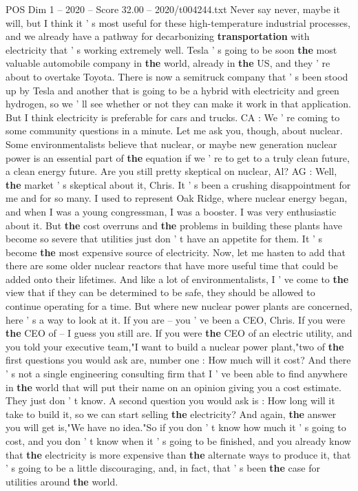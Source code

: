 \begin{textsample}{POS Dim 1 – 2020 – Score 32.00 – 2020/t004244.txt}
Never say never, maybe it will, but I think it ' s most useful for these high-temperature industrial processes, and we already have a pathway for decarbonizing \textbf{transportation} with electricity that ' s working extremely well.
Tesla ' s going to be soon \textbf{the} most valuable automobile company in \textbf{the} world, already in \textbf{the} US, and they ' re about to overtake Toyota.
There is now a semitruck company that ' s been stood up by Tesla and another that is going to be a hybrid with electricity and green hydrogen, so we ' ll see whether or not they can make it work in that application.
But I think electricity is preferable for cars and trucks.
CA : We ' re coming to some community questions in a minute.
Let me ask you, though, about nuclear.
Some environmentalists believe that nuclear, or maybe new generation nuclear power is an essential part of \textbf{the} equation if we ' re to get to a truly clean future, a clean energy future.
Are you still pretty skeptical on nuclear, Al?
AG : Well, \textbf{the} market ' s skeptical about it, Chris.
It ' s been a crushing disappointment for me and for so many.
I used to represent Oak Ridge, where nuclear energy began, and when I was a young congressman, I was a booster.
I was very enthusiastic about it.
But \textbf{the} cost overruns and \textbf{the} problems in building these plants have become so severe that utilities just don ' t have an appetite for them.
It ' s become \textbf{the} most expensive source of electricity.
Now, let me hasten to add that there are some older nuclear reactors that have more useful time that could be added onto their lifetimes.
And like a lot of environmentalists, I ' ve come to \textbf{the} view that if they can be determined to be safe, they should be allowed to continue operating for a time.
But where new nuclear power plants are concerned, here ' s a way to look at it.
If you are -- you ' ve been a CEO, Chris.
If you were \textbf{the} CEO of -- I guess you still are.
If you were \textbf{the} CEO of an electric utility, and you told your executive team,"I want to build a nuclear power plant,"two of \textbf{the} first questions you would ask are, number one : How much will it cost?
And there ' s not a single engineering consulting firm that I ' ve been able to find anywhere in \textbf{the} world that will put their name on an opinion giving you a cost estimate.
They just don ' t know.
A second question you would ask is : How long will it take to build it, so we can start selling \textbf{the} electricity?
And again, \textbf{the} answer you will get is,"We have no idea."So if you don ' t know how much it ' s going to cost, and you don ' t know when it ' s going to be finished, and you already know that \textbf{the} electricity is more expensive than \textbf{the} alternate ways to produce it, that ' s going to be a little discouraging, and, in fact, that ' s been \textbf{the} case for utilities around \textbf{the} world.

\end{textsample}
